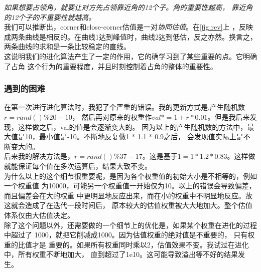 \documentclass[a4paper]{article}
\begin{document}
\emph{如果想要占领角，就要让对方先占领靠近角的12个子。角的重要性越高，
靠近角的12个子的不重要性就越高。}\\

我们可以推断出，corner和close-corner估值是一对\emph{协同估值}。在\autoref{fig:rev}上
，反映成两条曲线是相反的。在曲线1达到峰值时，曲线2达到低估，反之亦然。换言之，
两条曲线的求和是一条比较稳定的直线。\\

这说明我们的进化算法产生了一定的作用，它的确学习到了某些重要的点。它明确了占角
这个行为的重要程度，并且时刻控制着占角的整体的重要性。

\subsubsection{遇到的困难}
在第一次进行进化算法时，我犯了个严重的错误。我的更新方式是,产生随机数$r = rand() \% 20 - 10$，
然后再对原来的权重作$val *= 1 + r * 0.01$。但是我后来发现，这样做之后，val的值是会逐渐变大的。
因为以上的产生随机数的方法中，最大值是10，最小值是-10。不断地反复做1 * 1.1 * 0.9之后，
会发现值实际上是不断变大的。\\

后来我的解决方法是，$r = rand() \% 37 - 17$。这是基于$1 = 1 * 1.2 * 0.83$。这样做
就能保证每个值在多次运算后，结果大致不变。\\

为什么以上的这个细节很重要呢，是因为各个权重值的初始大小是不相等的，例如一个权重值
为10000，可能另一个权重值一开始仅为10。以上的错误会导致偏差，而且偏差会在大的权重
中更明显地反应出来，而在小的权重中不明显地反应。故这就会造成了在迭代一段时间后，
原本较大的估值权重被大大地加大。整个估值体系仅由大估值决定。\\

除了这个问题以外，还需要做的一个细节上的优化是，如果某个权重在进化的过程中超过了
1000，就把它削减成1000。因为估值权重的绝对值是不重要的， 只有权重的比值才是
重要的。如果所有权重同时乘以2，估值效果不变。我试过在进化中，所有权重不断地加大，
直到超过了1e10。这可能导致溢出等不好的结果发生。
\end{document}
